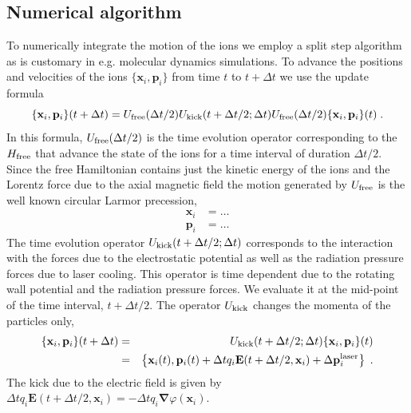 \documentclass[aps, pra, preprint]{revtex4-1}
\newcommand{\hfree}{H_{\rm free}}
\begin{document}
\subsection{Numerical algorithm}

To numerically integrate the motion of the ions we employ a split
step algorithm as is customary in e.g. molecular dynamics
simulations. To advance the positions and velocities of the ions
$\{\mathbf{x}_i, \mathbf{p}_i\}$
from time $t$ to $t + \Delta t$ we use the update formula
\begin{equation}
  \{\mathbf{x}_i, \mathbf{p}_i\}(t+\Delta t) =
  U_{\rm free}(\Delta t /2)
  U_{\rm kick}(t + \Delta t / 2; \Delta t)
  U_{\rm free}(\Delta t /2)
  \{\mathbf{x}_i, \mathbf{p}_i\}(t)\;.
\end{equation}
In this formula, $U_{\rm free}(\Delta t/2)$ is the time evolution
operator corresponding to the $\hfree$ that advance the state of
the ions for a time interval of duration $\Delta t / 2$. Since
the free Hamiltonian contains just the kinetic energy of the ions
and the Lorentz force due to the axial magnetic field the motion
generated by $U_{\rm free}$ is the well known circular Larmor
precession,
\begin{eqnarray}
  \mathbf{x}_i &= \ldots\\
  \mathbf{p}_i &= \ldots
\end{eqnarray}
The time evolution operator $U_{\rm kick}(t + \Delta t/2; \Delta
t)$ corresponds to the interaction with the forces due to the
electrostatic potential as well as the radiation pressure forces
due to laser cooling. This operator is time dependent due to the
rotating wall potential and the radiation pressure forces. We
evaluate it at the mid-point of the time interval, $t + \Delta t
/ 2$. The operator $U_{\rm kick}$ changes the momenta of the
particles only,
\begin{eqnarray}
  \{\mathbf{x}_i, \mathbf{p}_i\}(t + \Delta t)
  &=& U_{\rm kick}(t + \Delta t /2; \Delta t)
    \{\mathbf{x}_i, \mathbf{p}_i\}(t)\\
  &=&\left\{
      \mathbf{x}_i(t),
      \mathbf{p}_i(t) +
      \Delta t q_i \mathbf{E}(t + \Delta t / 2, \mathbf{x}_i) +
      \Delta \mathbf{p}_i^{\rm laser}
      \right\}\;.
\end{eqnarray}
The kick due to the electric field is given by $\Delta t
q_i\mathbf{E}(t+\Delta t /2,\mathbf{x}_i) = -\Delta t
q_i\mathbf{\nabla}\varphi(\mathbf{x}_i)$.
\end{document}
